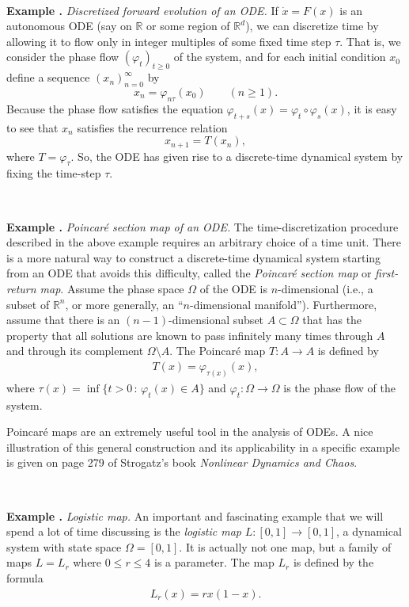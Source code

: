 \documentclass[12pt]{amsart}
\newcommand{\eqst}[1]{\begin{align*}#1\end{align*}}
\newcounter{example}
\newcommand{\beginexample}[1]{\ \\ \addtocounter{example}{1} \textbf{Example \arabic{example}.} \textit{#1.}}
\begin{document}
\beginexample{Discretized forward evolution of an ODE} If $\dot{x}=F(x)$ is an autonomous ODE (say on $\mathbb{R}$ or some region of $\mathbb{R}^d$), we can discretize time by allowing it to flow only in integer multiples of some fixed time step $\tau$. That is, we consider the phase flow $(\varphi_t)_{t\ge 0}$ of the system, and for each initial condition $x_0$ define a sequence $(x_n)_{n=0}^\infty$ by
$$ x_n = \varphi_{n\tau}(x_0) \qquad (n\ge 1). $$
Because the phase flow satisfies the equation $\varphi_{t+s}(x)=\varphi_t\circ \varphi_s(x)$, it is easy to see that $x_n$ satisfies the recurrence relation
$$ x_{n+1} = T(x_n),
$$
where $T = \varphi_\tau$. So, the ODE has given rise to a discrete-time dynamical system by fixing the time-step $\tau$.

\beginexample{Poincar\'e section map of an ODE} The time-discretization procedure described in the above example requires an arbitrary choice of a time unit. There is a more natural way to construct a discrete-time dynamical system starting from an ODE that avoids this difficulty, called the \emph{Poincar\'e section map} or \emph{first-return map}. Assume the phase space $\Omega$ of the ODE is $n$-dimensional (i.e., a subset of $\mathbb{R}^n$, or more generally, an ``$n$-dimensional manifold''). Furthermore, assume that there is an $(n-1)$-dimensional subset $A \subset \Omega$ that has the property that all solutions are known to pass infinitely many times through $A$ and through its complement $\Omega\setminus A$. The Poincar\'e map $T:A\to A$ is defined by
\eqst{
T(x) = \varphi_{\tau(x)}(x),
}
where
$\tau(x) = \inf\{ t>0\,:\, \varphi_t(x)\in A\}$ and $\varphi_t:\Omega\to\Omega$ is the phase flow of the system. 

Poincar\'e maps are an extremely useful tool in the analysis of ODEs. A nice illustration of this general construction and its applicability in a specific example is given on page 279 of Strogatz's book \emph{Nonlinear Dynamics and Chaos}.

\beginexample{Logistic map} An important and fascinating example that we will spend a lot of time discussing is the \emph{logistic map} \hbox{$L:[0,1]\to[0,1]$}, a dynamical system with state space $\Omega=[0,1]$. It is actually not one map, but a family of maps $L=L_r$ where $0\le r\le 4$ is a parameter. The map $L_r$ is defined by the formula
\eqst{
L_r(x) = rx(1-x).
}
\end{document}
